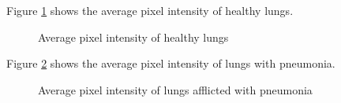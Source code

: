 \documentclass[9pt,twocolumn,twoside]{opticajnl}
\begin{document}
Figure \ref{fig:normal-pixel-intensity} shows the average pixel intensity of healthy lungs.

\begin{figure}[ht]
\centering
{}
\caption{Average pixel intensity of healthy lungs}
\label{fig:normal-pixel-intensity}
\end{figure}

Figure \ref{fig:pneumonia-pixel-intensity} shows the average pixel intensity of lungs with pneumonia.

\begin{figure}[ht]
\centering
{}
\caption{Average pixel intensity of lungs afflicted with pneumonia}
\label{fig:pneumonia-pixel-intensity}
\end{figure}
\end{document}
